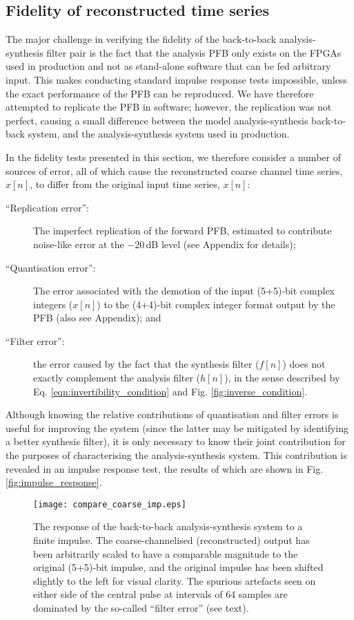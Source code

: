 \documentclass{pasa}%
\begin{document}
\subsection{Fidelity of reconstructed time series}
\label{sec:fidelity}

The major challenge in verifying the fidelity of the back-to-back analysis-synthesis filter pair is the fact that the analysis PFB only exists on the FPGAs used in production and not as stand-alone software that can be fed arbitrary input.
This makes conducting standard impulse response tests impossible, unless the exact performance of the PFB can be reproduced.
We have therefore attempted to replicate the PFB in software; however, the replication was not perfect, causing a small difference between the model analysis-synthesis back-to-back system, and the analysis-synthesis system used in production.

In the fidelity tests presented in this section, we therefore consider a number of sources of error, all of which cause the reconstructed coarse channel time series, $\hat{x}[n]$, to differ from the original input time series, $x[n]$:
\begin{description}
    \item[``Replication error'':] The imperfect replication of the forward PFB, estimated to contribute noise-like error at the $-20\,$dB level (see Appendix for details);
    \item[``Quantisation error'':] The error associated with the demotion of the input (5+5)-bit complex integers ($x[n]$) to the (4+4)-bit complex integer format output by the PFB (also see Appendix); and
    \item[``Filter error'':] the error caused by the fact that the synthesis filter ($f[n]$) does not exactly complement the analysis filter ($h[n]$), in the sense described by Eq. \eqref{eqn:invertibility_condition} and Fig. \ref{fig:inverse_condition}.
\end{description}
Although knowing the relative contributions of quantisation and filter errors is useful for improving the system (since the latter may be mitigated by identifying a better synthesis filter), it is only necessary to know their joint contribution for the purposes of characterising the analysis-synthesis system.
This contribution is revealed in an impulse response test, the results of which are shown in Fig. \eqref{fig:impulse_response}.
\begin{figure}
    \centering
    \texttt{[image: compare\_coarse\_imp.eps]}
    \caption{The response of the back-to-back analysis-synthesis system to a finite impulse. The coarse-channelised (reconstructed) output has been arbitrarily scaled to have a comparable magnitude to the original (5+5)-bit impulse, and the original impulse has been shifted slightly to the left for visual clarity. The spurious artefacts seen on either side of the central pulse at intervals of 64 samples are dominated by the so-called ``filter error'' (see text).}
    \label{fig:impulse_response}
\end{figure}
\end{document}
